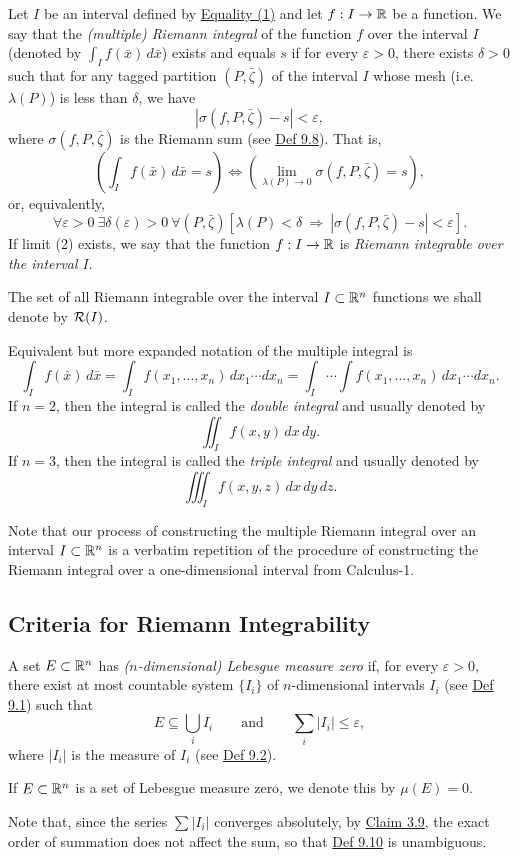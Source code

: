 \begin{definition}\label{def:9.9}
Let $I$ be an interval defined by \hyperref[eq:9:1:1]{Equality (1)} and let $f:I\to\mathbb{R}$ be a function. We say that the \emph{(multiple) Riemann integral} of the function $f$ over the interval $I$ (denoted by $\int_I f(\bar x)\,d\bar x$) exists and equals $s$ if for every $\varepsilon>0$, there exists $\delta>0$ such that for any tagged partition $(P,\bar\zeta)$ of the interval $I$ whose mesh (i.e. $\lambda(P)$) is less than $\delta$, we have
\[
|\sigma(f,P,\bar\zeta)-s|<\varepsilon,
\]
where $\sigma(f,P,\bar\zeta)$ is the Riemann sum (see \hyperref[def:9.8]{Def 9.8}). That is,
\[
\left(\int_I f(\bar x)\,d\bar x=s\right)
\Longleftrightarrow
\left(\lim_{\lambda(P)\to0}\sigma(f,P,\bar\zeta)=s\right),
\tag{2}\label{eq:9:2:1}
\]
or, equivalently,
\[
\forall\varepsilon>0\ \exists\delta(\varepsilon)>0\ \forall(P,\bar\zeta)
\left[\lambda(P)<\delta\ \Longrightarrow\ |\sigma(f,P,\bar\zeta)-s|<\varepsilon\right].
\]
If limit (2) exists, we say that the function $f:I\to\mathbb{R}$ is \emph{Riemann integrable over the interval $I$}.

The set of all Riemann integrable over the interval $I\subset\mathbb{R}^n$ functions we shall denote by $\mathcal{R}(I)$.
\end{definition}

Equivalent but more expanded notation of the multiple integral is
\[
\int_I f(\bar x)\,d\bar x
=\int_I f(x_1,\ldots,x_n)\,dx_1\cdots dx_n
=\int_I\cdots\int f(x_1,\ldots,x_n)\,dx_1\cdots dx_n.
\]
If $n=2$, then the integral is called the \emph{double integral} and usually denoted by
\[
\iint_I f(x,y)\,dx\,dy.
\]
If $n=3$, then the integral is called the \emph{triple integral} and usually denoted by
\[
\iiint_I f(x,y,z)\,dx\,dy\,dz.
\]

Note that our process of constructing the multiple Riemann integral over an interval $I\subset\mathbb{R}^n$ is a verbatim repetition of the procedure of constructing the Riemann integral over a one-dimensional interval from Calculus-1.

\subsection*{Criteria for Riemann Integrability}

\begin{definition}\label{def:9.10}
A set $E\subset\mathbb{R}^n$ has \emph{($n$-dimensional) Lebesgue measure zero} if, for every $\varepsilon>0$, there exist at most countable system $\{I_i\}$ of $n$-dimensional intervals $I_i$ (see \hyperref[def:9.1]{Def 9.1}) such that
\[
E\subseteq\bigcup_i I_i
\qquad\text{and}\qquad
\sum_i |I_i|\leq\varepsilon,
\]
where $|I_i|$ is the measure of $I_i$ (see \hyperref[def:9.2]{Def 9.2}).

If $E\subset\mathbb{R}^n$ is a set of Lebesgue measure zero, we denote this by $\mu(E)=0$.

Note that, since the series $\sum |I_i|$ converges absolutely, by \hyperref[claim:3.9]{Claim 3.9}, the exact order of summation does not affect the sum, so that \hyperref[def:9.10]{Def 9.10} is unambiguous.
\end{definition}

